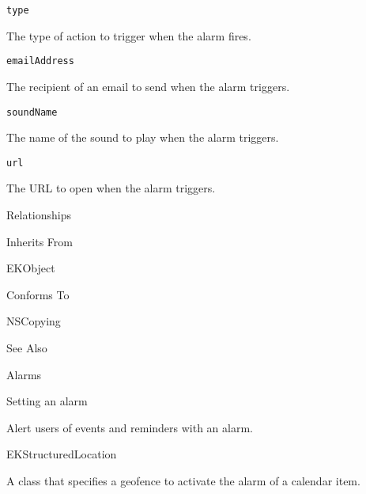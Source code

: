 \documentclass{article}
\begin{document}
\texttt{type}

The type of action to trigger when the alarm fires.

\texttt{emailAddress}

The recipient of an email to send when the alarm triggers.

\texttt{soundName}

The name of the sound to play when the alarm triggers.

\texttt{url}

The URL to open when the alarm triggers.

Relationships

Inherits From

EKObject

Conforms To

NSCopying

See Also

Alarms

Setting an alarm

Alert users of events and reminders with an alarm.

EKStructuredLocation

A class that specifies a geofence to activate the alarm of a calendar item.

\newpage
\end{document}
